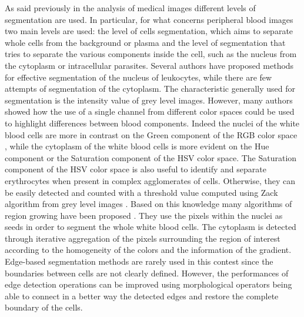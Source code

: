 \documentclass[final,a4paper,12pt,english]{UnicaPhdThesis3}
\begin{document}
As said previously in the analysis of medical images different levels of segmentation are used. In particular, for what concerns peripheral blood images two main levels are used: the level of cells segmentation, which aims to separate whole cells from the background or plasma and the level of segmentation that tries to separate the various components inside the cell, such as the nucleus from the cytoplasm or intracellular parasites. Several authors have proposed methods for effective segmentation of the nucleus of leukocytes, while there are few attempts of segmentation of the cytoplasm. The characteristic generally used for segmentation is the intensity value of grey level images. However, many authors showed how the use of a single channel from different color spaces could be used to highlight differences between blood components. Indeed the nuclei of the white blood cells are more in contrast on the Green component of the RGB color space \cite{Cseke}, while the cytoplasm of the white blood cells is more evident on the Hue component \cite{Wu} or the Saturation component \cite{Halim} of the HSV color space. The Saturation component of the HSV color space is also useful to identify and separate erythrocytes \cite{DiR} when present in complex agglomerates of cells. Otherwise, they can be easily detected and counted with a threshold value computed using Zack algorithm from grey level images \cite{Berge}. Based on this knowledge many algorithms of region growing have been proposed \cite{Kovalev, Lez98, Lez02}. They use the pixels within the nuclei as seeds in order to segment the whole white blood cells. The cytoplasm is detected through iterative aggregation of the pixels surrounding the region of interest according to the homogeneity of the colors and the information of the gradient. Edge-based segmentation methods are rarely used in this contest since the boundaries between cells are not clearly defined. However, the performances of edge detection operations can be improved using morphological operators \cite{Piuri, Sco05} being able to connect in a better way the detected edges and restore the complete boundary of the cells. 
\end{document}
